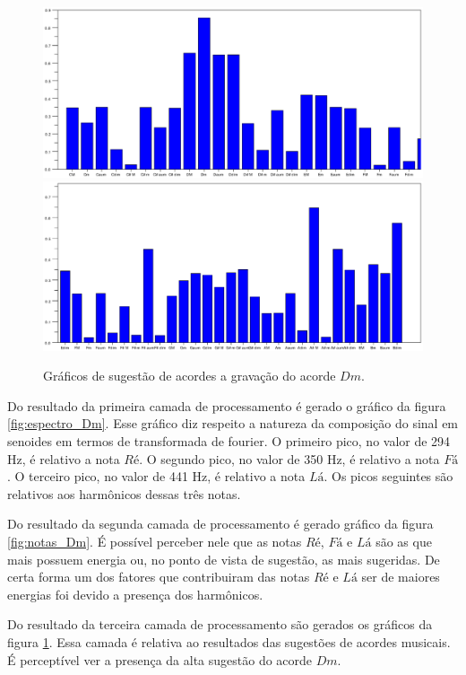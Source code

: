 \begin{figure}[h]
	\centering
		\includegraphics[keepaspectratio=true,scale=0.49]{figuras/Dm/acordes_1_Dm.eps}
		\includegraphics[keepaspectratio=true,scale=0.49]{figuras/Dm/acordes_2_Dm.eps}
	\caption{Gráficos de sugestão de acordes a gravação do acorde $Dm$.}
  \label{fig:acordes_Dm}
\end{figure}


Do resultado da primeira camada de processamento é gerado o gráfico da figura \ref{fig:espectro_Dm}. Esse gráfico diz respeito a natureza da composição do sinal em senoides em termos de transformada de fourier. O primeiro pico, no valor de 294 Hz, é relativo a nota $Ré$. O segundo pico, no valor de 350 Hz, é relativo a nota $Fá$. O terceiro pico, no valor de 441 Hz, é relativo a nota $Lá$. Os picos seguintes são relativos aos harmônicos dessas três notas.

Do resultado da segunda camada de processamento é gerado gráfico da figura \ref{fig:notas_Dm}. É possível perceber nele que as notas $Ré$, $Fá$ e $Lá$ são as que mais possuem energia ou, no ponto de vista de sugestão, as mais sugeridas. De certa forma um dos fatores que contribuiram das notas $Ré$ e $Lá$ ser de maiores energias foi devido a presença dos harmônicos.

Do resultado da terceira camada de processamento são gerados os gráficos da figura \ref{fig:acordes_Dm}. Essa camada é relativa ao resultados das sugestões de acordes musicais. É perceptível ver a presença da alta sugestão do acorde $Dm$.

